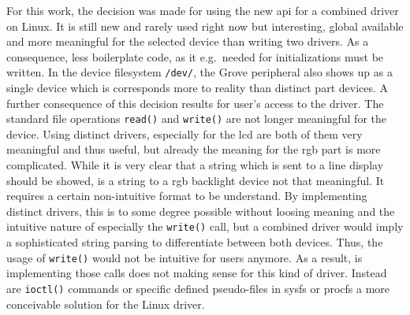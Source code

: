 For this work, the decision was made for using the new \ac{api} for a combined driver on Linux.
It is still new and rarely used right now but interesting, global available and more meaningful for the selected device than writing two drivers.
As a consequence, less boilerplate code, as it e.g.\ needed for initializations must be written.
In the device filesystem \texttt{/dev/}, the Grove peripheral also shows up as a single device which is corresponds more to reality than distinct part devices.
A further consequence of this decision results for user's access to the driver.
The standard file operations \texttt{read()} and \texttt{write()} are not longer meaningful for the device.
Using distinct drivers, especially for the \ac{lcd} are both of them very meaningful and thus useful, but already the meaning for the \ac{rgb} part is more complicated.
While it is very clear that a string which is sent to a line display should be showed, is a string to a \ac{rgb} backlight device not that meaningful.
It requires a certain non-intuitive format to be understand.
By implementing distinct drivers, this is to some degree possible without loosing meaning and the intuitive nature of especially the \texttt{write()} call, but a combined driver would imply a sophisticated string parsing to differentiate between both devices.
Thus, the usage of \texttt{write()} would not be intuitive for users anymore.
As a result, is implementing those calls does not making sense for this kind of driver.
Instead are \texttt{ioctl()} commands or specific defined pseudo-files in sysfs or procfs a more conceivable solution for the Linux driver.

